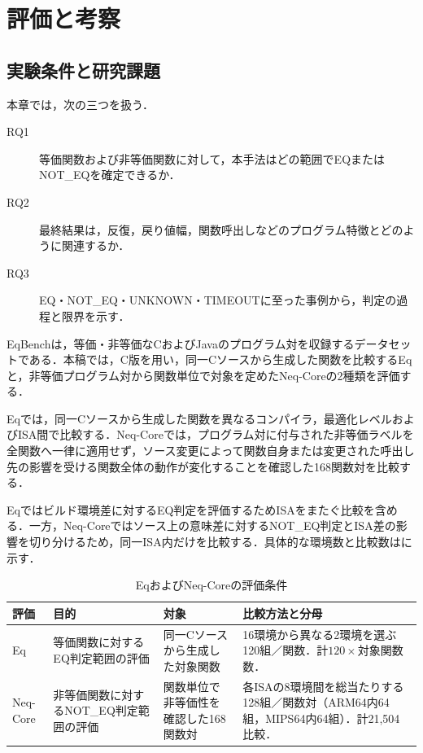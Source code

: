 \section{評価と考察}

\subsection{実験条件と研究課題}
本章では，次の三つを扱う．
\begin{description}
  \item[RQ1] 等価関数および非等価関数に対して，本手法はどの範囲でEQまたはNOT\_EQを確定できるか．
  \item[RQ2] 最終結果は，反復，戻り値幅，関数呼出しなどのプログラム特徴とどのように関連するか．
  \item[RQ3] EQ・NOT\_EQ・UNKNOWN・TIMEOUTに至った事例から，判定の過程と限界を示す．
\end{description}

EqBench\cite{eqbench}は，等価・非等価なCおよびJavaのプログラム対を収録するデータセットである．本稿では，C版を用い，同一Cソースから生成した関数を比較するEqと，非等価プログラム対から関数単位で対象を定めたNeq-Coreの2種類を評価する．

Eqでは，同一Cソースから生成した関数を異なるコンパイラ，最適化レベルおよびISA間で比較する．Neq-Coreでは，プログラム対に付与された非等価ラベルを全関数へ一律に適用せず，ソース変更によって関数自身または変更された呼出し先の影響を受ける関数全体の動作が変化することを確認した168関数対を比較する．

Eqではビルド環境差に対するEQ判定を評価するためISAをまたぐ比較を含める．一方，Neq-Coreではソース上の意味差に対するNOT\_EQ判定とISA差の影響を切り分けるため，同一ISA内だけを比較する．具体的な環境数と比較数はに示す．

\begin{table}[t]
\centering
\caption{EqおよびNeq-Coreの評価条件}
\label{tab:evaluation-design}
\footnotesize
\setlength{\tabcolsep}{1.5pt}
\begin{tabular}{@{}p{16mm}p{32mm}p{52mm}p{61mm}@{}}
\hline\hline
\textbf{評価} & \textbf{目的} & \textbf{対象} & \textbf{比較方法と分母} \\
\hline
Eq & 等価関数に対するEQ判定範囲の評価 & 同一Cソースから生成した対象関数 & 16環境から異なる2環境を選ぶ120組／関数．計$120\times$対象関数数． \\
Neq-Core & 非等価関数に対するNOT\_EQ判定範囲の評価 & 関数単位で非等価性を確認した168関数対 & 各ISAの8環境間を総当たりする128組／関数対（ARM64内64組，MIPS64内64組）．計21,504比較． \\
\hline
\end{tabular}
\end{table}

